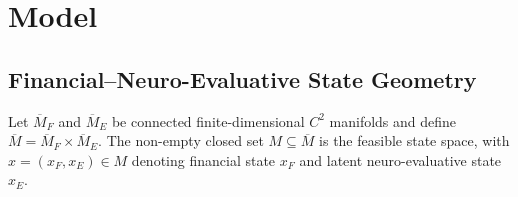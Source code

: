 \documentclass[graybox,natbib]{SNmult}
\providecommand{\1}{}
\renewcommand{\1}{\mathbbm 1}
\begin{document}
\section{Model}
\label{sec:model}

\subsection{Financial--Neuro-Evaluative State Geometry}
\label{subsec:state-geometry}

Let \(\overline M_F\) and \(\overline M_E\) be connected finite-dimensional
\(C^2\) manifolds and define
\(\overline M=\overline M_F\times\overline M_E\). The non-empty closed set
\(M\subseteq\overline M\) is the feasible state space, with
\(x=(x_F,x_E)\in M\) denoting financial state \(x_F\) and latent
neuro-evaluative state \(x_E\).
\end{document}
